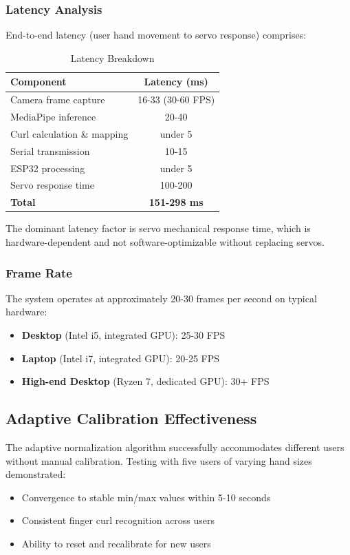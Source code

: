 \documentclass[12pt]{article}
\begin{document}
\subsubsection{Latency Analysis}

End-to-end latency (user hand movement to servo response) comprises:

\begin{table}[H]
\centering
\begin{tabular}{lc}
\toprule
\textbf{Component} & \textbf{Latency (ms)} \\
\midrule
Camera frame capture & 16-33 (30-60 FPS) \\
MediaPipe inference & 20-40 \\
Curl calculation \& mapping & under 5 \\
Serial transmission & 10-15 \\
ESP32 processing & under 5 \\
Servo response time & 100-200 \\
\midrule
\textbf{Total} & \textbf{151-298 ms} \\
\bottomrule
\end{tabular}
\caption{Latency Breakdown}
\label{tab:latency}
\end{table}

The dominant latency factor is servo mechanical response time, which is hardware-dependent and not software-optimizable without replacing servos.

\subsubsection{Frame Rate}

The system operates at approximately 20-30 frames per second on typical hardware:
\begin{itemize}
    \item \textbf{Desktop} (Intel i5, integrated GPU): 25-30 FPS
    \item \textbf{Laptop} (Intel i7, integrated GPU): 20-25 FPS
    \item \textbf{High-end Desktop} (Ryzen 7, dedicated GPU): 30+ FPS
\end{itemize}

\subsection{Adaptive Calibration Effectiveness}

The adaptive normalization algorithm successfully accommodates different users without manual calibration. Testing with five users of varying hand sizes demonstrated:
\begin{itemize}
    \item Convergence to stable min/max values within 5-10 seconds
    \item Consistent finger curl recognition across users
    \item Ability to reset and recalibrate for new users
\end{itemize}
\end{document}
